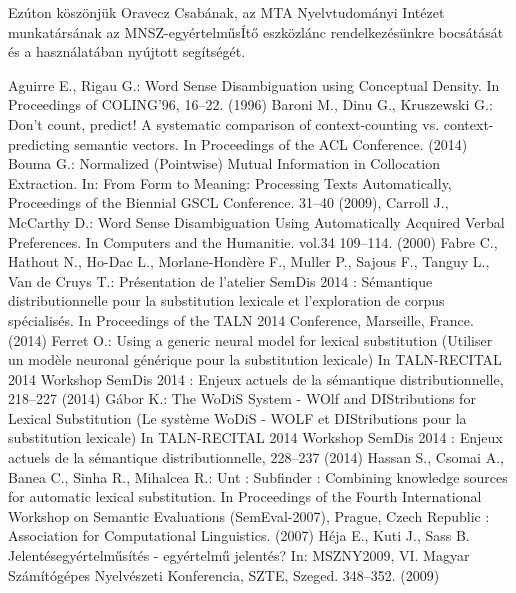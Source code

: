\documentclass{llncs}
\begin{document}
Ez\'{u}ton k\"{o}sz\"{o}nj\"{u}k Oravecz Csab\'{a}nak, az MTA Nyelvtudom\'anyi Int\'ezet munkat\'{a}rs\'{a}nak az MNSZ-egy\'{e}rtelm\H{u}s\'{I}t\H{o} eszk\"{o}zl\'{a}nc rendelkez\'{e}s\"{u}nkre bocs\'{a}t\'{a}s\'{a}t \'{e}s a haszn\'{a}lat\'{a}ban ny\'{u}jtott seg\'{i}ts\'{e}g\'{e}t.
%
%
\begin{thebibliography}{15}
%
Aguirre E., Rigau G.:
Word Sense Disambiguation using Conceptual Density.
In Proceedings of COLING'96, 16--22. (1996)
%
Baroni M., Dinu G., Kruszewski G.:
Don't count, predict! A systematic comparison of context-counting vs. context-predicting semantic vectors. 
In Proceedings of the ACL Conference. (2014)
%
Bouma G.:
Normalized (Pointwise) Mutual Information in Collocation Extraction.
In: From Form to Meaning: Processing Texts Automatically, Proceedings of the Biennial GSCL Conference. 31--40 (2009),
%
Carroll J., McCarthy D.:
Word Sense Disambiguation Using Automatically Acquired Verbal Preferences.
In Computers and the Humanitie. vol.34 109--114. (2000)%
Fabre C., Hathout N., Ho-Dac L., Morlane-Hond\`{e}re F., Muller P., Sajous F., Tanguy L., Van de Cruys T.:
Pr\'{e}sentation de l'atelier SemDis 2014 : S\'{e}mantique distributionnelle pour la substitution lexicale et l'exploration de corpus sp\'{e}cialis\'{e}s.
In Proceedings of the TALN 2014 Conference, Marseille, France. (2014)
%
Ferret O.:
Using a generic neural model for lexical substitution (Utiliser un mod{\`e}le neuronal g{\'e}n{\'e}rique pour la substitution lexicale)
In TALN-RECITAL 2014 Workshop SemDis 2014 : Enjeux actuels de la s{\'e}mantique distributionnelle, 218--227 (2014)
%
G\'{a}bor K.:
The WoDiS System - WOlf and DIStributions for Lexical Substitution (Le syst{\`e}me WoDiS - WOLF et DIStributions pour la substitution lexicale)
In TALN-RECITAL 2014 Workshop SemDis 2014 : Enjeux actuels de la s{\'e}mantique distributionnelle, 228--237 (2014)
%
Hassan S., Csomai A., Banea C., Sinha R., Mihalcea R.:
Unt : Subfinder : Combining knowledge sources for automatic lexical substitution. 
In Proceedings of the Fourth International Workshop on Semantic Evaluations (SemEval-2007), Prague, Czech Republic : Association for Computational Linguistics. (2007)
%
H\'{e}ja E., Kuti J., Sass B.
Jelent\'{e}segy\'{e}rtelm\H{u}s\'{i}t\'{e}s - egy\'{e}rtelm\H{u} jelent\'{e}s?
In: MSZNY2009, VI. Magyar Sz\'{a}m\'{i}t\'{o}g\'{e}pes Nyelv\'{e}szeti Konferencia, SZTE, Szeged. 348--352. (2009) 

\end{thebibliography}
\end{document}
